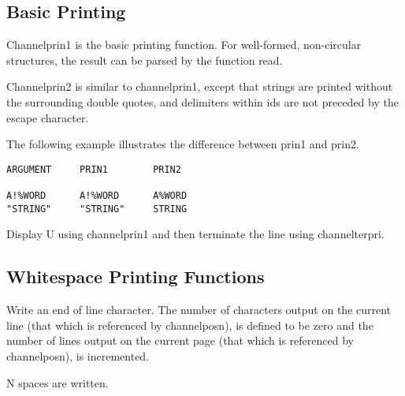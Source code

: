 \subsection{Basic Printing}

{}

{    Channelprin1  is  the  basic   printing   function.      For
    well-formed,  non-circular  structures,  the  result  can be
    parsed by the function read.
}

{}

{    Channelprin2 is similar to channelprin1, except that strings
    are printed without the  surrounding  double  quotes,    and
    delimiters  within  ids  are  not  preceded  by  the  escape
    character.
}
  
		The following example illustrates the difference between prin1
and prin2.

\begin{verbatim}
ARGUMENT     PRIN1        PRIN2

A!%WORD      A!%WORD      A%WORD
"STRING"     "STRING"     STRING
\end{verbatim}

{}

{    Display U using channelprin1 and  then  terminate  the  line
    using channelterpri.
}
\subsection{Whitespace Printing Functions}

{}

{    Write  an  end  of line character.  The number of characters
    output on the current line  (that  which  is  referenced  by
    channelposn),  is defined to be zero and the number of lines
    output on the current page  (that  which  is  referenced  by
    channelposn), is incremented.
}

{}

{    N spaces are written.
}

